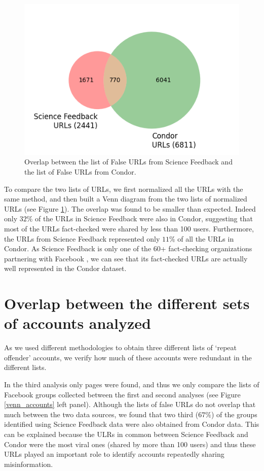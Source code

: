 \documentclass[review]{elsarticle}
\begin{document}
{{\begin{figure}[!h]
\centering
\includegraphics[scale=0.5]{./../figure/supplementary_venn_urls.png}
\caption{
Overlap between the list of False URLs from Science Feedback and the list of False URLs from Condor.
}
\label{venn_urls}
\end{figure}

To compare the two lists of URLs, we first normalized all the URLs with the same method, and then built a Venn diagram from the two lists of normalized URLs (see Figure \ref{venn_urls}). 
The overlap was found to be smaller than expected. 
Indeed only $32\%$ of the URLs in Science Feedback were also in Condor, suggesting that most of the URLs fact-checked were shared by less than 100 users. 
Furthermore, the URLs from Science Feedback represented only $11\%$ of all the URLs in Condor. As Science Feedback is only one of the 60+ fact-checking organizations partnering with Facebook \citep{60factCheckingPartners}, we can see that its fact-checked URLs are actually well represented in the Condor dataset.

\section*{Overlap between the different sets of accounts analyzed}

As we used different methodologies to obtain three different lists of `repeat offender' accounts, we verify how much of these accounts were redundant in the different lists. 

In the third analysis only pages were found, and thus we only compare the lists of Facebook groups collected between the first and second analyses (see Figure \ref{venn_accounts} left panel). 
Although the lists of false URLs do not overlap that much between the two data sources, we found that two third ($67\%$) of the groups identified using Science Feedback data were also obtained from Condor data. 
This can be explained because the ULRs in common between Science Feedback and Condor were the most viral ones (shared by more than 100 users) and thus these URLs played an important role to identify accounts repeatedly sharing misinformation.

}}
\end{document}
